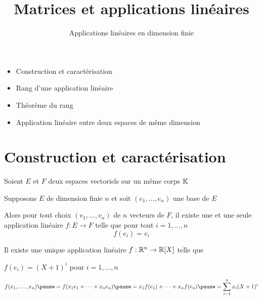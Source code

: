 

    





\title{{\bf Matrices et applications linéaires}}
\subtitle{Applications linéaires en dimension finie}

\begin{frame}
  
  \debutmontitre

  \pause

{\footnotesize
\hfill
{}
\begin{minipage}{0.6\textwidth}
  \begin{itemize}
    \item<3-> Construction et caractérisation
    \item<4-> Rang d'une application linéaire
    \item<5-> Théorème du rang
    \item<6-> Application linéaire entre deux espaces de même dimension
  \end{itemize}
\end{minipage}
}

\end{frame}

\setcounter{framenumber}{0}


\section{Construction et caractérisation}

\begin{frame}

Soient $E$ et $F$ deux espaces vectoriels sur un même corps $\mathbb{K}$

\pause

\begin{theoreme}
Supposons $E$ de dimension finie $n$
et soit $(e_1,\dots,e_n)$ une base de $E$

Alors pour tout choix $(v_1, \ldots ,v_n)$ 
de $n$ vecteurs de $F$, il existe une et une seule 
application linéaire $f : E \to F$
 telle que pour tout $i=1,\ldots,n$ 
$$f(e_i)=v_i$$
\end{theoreme}  

\bigskip
\pause

\begin{exemple}
Il existe une unique application linéaire $f : \mathbb{R}^n \to \mathbb{R}[X]$  
telle que 

\centerline{$f(e_i) = (X+1)^i$ pour $i=1,\ldots,n$}
\vspace*{-4ex}
\small
\pause
$$f(x_1,\ldots,x_n) 
\pause = f(x_1e_1+\cdots +x_n e_n) 
\pause = x_1f(e_1)+\cdots +x_nf(e_n) 
\pause = \sum_{i=1}^n x_i(X+1)^i$$%

\vspace*{-2ex}
\end{exemple}


\end{frame}


